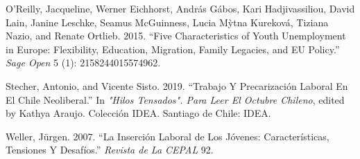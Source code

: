 \documentclass[]{article}
\begin{document}
\leavevmode\hypertarget{ref-oreilly_five_2015}{}%
O'Reilly, Jacqueline, Werner Eichhorst, András Gábos, Kari
Hadjivassiliou, David Lain, Janine Leschke, Seamus McGuinness, Lucia
Mỳtna Kureková, Tiziana Nazio, and Renate Ortlieb. 2015. ``Five
Characteristics of Youth Unemployment in Europe: Flexibility, Education,
Migration, Family Legacies, and EU Policy.'' \emph{Sage Open} 5 (1):
2158244015574962.

\leavevmode\hypertarget{ref-stecher_trabajo_2019}{}%
Stecher, Antonio, and Vicente Sisto. 2019. ``Trabajo Y Precarización
Laboral En El Chile Neoliberal.'' In \emph{"Hilos Tensados". Para Leer
El Octubre Chileno}, edited by Kathya Araujo. Colección IDEA. Santiago
de Chile: IDEA.

\leavevmode\hypertarget{ref-weller_insercion_2007}{}%
Weller, Jürgen. 2007. ``La Inserción Laboral de Los Jóvenes:
Características, Tensiones Y Desafíos.'' \emph{Revista de La CEPAL} 92.
\end{document}
